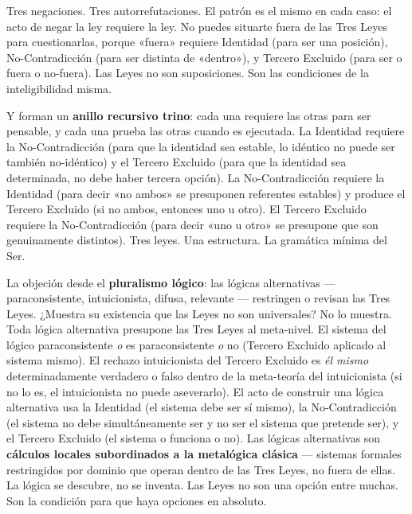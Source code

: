 \documentclass[10pt, openany, oneside]{book}
\begin{document}
\noindent Tres negaciones. Tres autorrefutaciones. El patrón es el mismo en cada caso: el acto de negar la ley requiere la ley. No puedes situarte fuera de las Tres Leyes para cuestionarlas, porque «fuera» requiere Identidad (para ser una posición), No-Contradicción (para ser distinta de «dentro»), y Tercero Excluido (para ser o fuera o no-fuera). Las Leyes no son suposiciones. Son las condiciones de la inteligibilidad misma.

Y forman un \textbf{anillo recursivo trino}: cada una requiere las otras para ser pensable, y cada una prueba las otras cuando es ejecutada. La Identidad requiere la No-Contradicción (para que la identidad sea estable, lo idéntico no puede ser también no-idéntico) y el Tercero Excluido (para que la identidad sea determinada, no debe haber tercera opción). La No-Contradicción requiere la Identidad (para decir «no ambos» se presuponen referentes estables) y produce el Tercero Excluido (si no ambos, entonces uno u otro). El Tercero Excluido requiere la No-Contradicción (para decir «uno u otro» se presupone que son genuinamente distintos). Tres leyes. Una estructura. La gramática mínima del Ser.

La objeción desde el \textbf{pluralismo lógico}: las lógicas alternativas --- paraconsistente, intuicionista, difusa, relevante --- restringen o revisan las Tres Leyes. ¿Muestra su existencia que las Leyes no son universales? No lo muestra. Toda lógica alternativa presupone las Tres Leyes al meta-nivel. El sistema del lógico paraconsistente \textit{o} es paraconsistente \textit{o} no (Tercero Excluido aplicado al sistema mismo). El rechazo intuicionista del Tercero Excluido es \textit{él mismo} determinadamente verdadero o falso dentro de la meta-teoría del intuicionista (si no lo es, el intuicionista no puede aseverarlo). El acto de construir una lógica alternativa usa la Identidad (el sistema debe ser sí mismo), la No-Contradicción (el sistema no debe simultáneamente ser y no ser el sistema que pretende ser), y el Tercero Excluido (el sistema o funciona o no). Las lógicas alternativas son \textbf{cálculos locales subordinados a la metalógica clásica} --- sistemas formales restringidos por dominio que operan dentro de las Tres Leyes, no fuera de ellas. La lógica se descubre, no se inventa. Las Leyes no son una opción entre muchas. Son la condición para que haya opciones en absoluto.

\vspace{1.5em}

\end{document}
